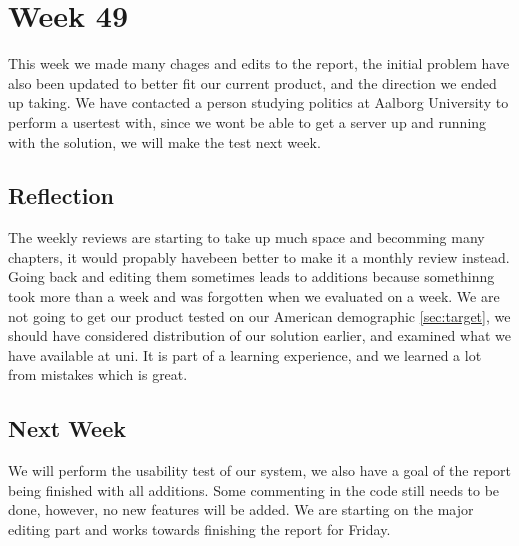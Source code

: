 \section*{Week 49}
This week we made many chages and edits to the report, the initial problem have
also been updated to better fit our current product, and the direction we ended
up taking. We have contacted a person studying politics at Aalborg University to
perform a usertest with, since we wont be able to get a server up and running
with the solution, we will make the test next week.

\subsection*{Reflection}
The weekly reviews are starting to take up much space and becomming many
chapters, it would propably havebeen better to make it a monthly review instead.
Going back and editing them sometimes leads to additions because somethinng took
more than a week and was forgotten when we evaluated on a week. We are not going
to get our product tested on our American demographic \autoref{sec:target}, we
should have considered distribution of our solution earlier, and examined what
we have available at uni. It is part of a learning experience, and we learned a
lot from mistakes which is great. 


\subsection*{Next Week}
We will perform the usability test of our system, we also have a goal of the
report being finished with all additions. Some commenting in the code still
needs to be done, however, no new features will be added. We are starting on the
major editing part and works towards finishing the report for Friday.



% 
% 
% 
